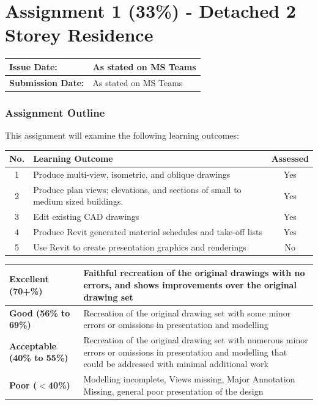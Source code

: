 
	
\part*{Assignment 1 (33\%) - Detached 2 Storey Residence}

\begin{tabularx}{\textwidth}{ |X|X| }
	\hline
	\textbf{Issue Date:} & As stated on MS Teams \\
	\hline 
	\textbf{Submission Date:}  & As stated on MS Teams \\
	\hline
\end{tabularx}


\section*{Assignment Outline}

This assignment will examine the following learning outcomes:\\

\begin{tabularx}{\textwidth}{ |c|X|c| }
	\hline
	\textbf{No.} & \textbf{Learning Outcome} & \textbf{Assessed} \\
	\hline 
	1  & Produce multi-view, isometric, and oblique drawings & Yes \\
	2  & Produce plan views; elevations, and sections of small to medium sized buildings. & Yes \\
	3  & Edit existing CAD drawings & Yes \\
	4  & Produce Revit generated material schedules and take-off lists & Yes \\
	5  & Use Revit to create presentation graphics and renderings & No \\
	\hline
\end{tabularx}


\vspace{1cm}

\begin{tabularx}{\textwidth}{ |l|X| }
	\hline 
	\textbf{Excellent (70+\%)} & Faithful recreation of the original drawings with no errors, and shows improvements over the original drawing set\\ 
	\hline
	\textbf{Good (56\% to 69\%)} & Recreation of the original drawing set with some minor errors or omissions in presentation and modelling \\
	\hline
	\textbf{Acceptable (40\% to 55\%)} & Recreation of the original drawing set with numerous minor errors or omissions in presentation and modelling that could be addressed with minimal additional work \\ 
	\hline
	\textbf{Poor ($<$40\%)} & Modelling incomplete, Views missing, Major Annotation Missing, general poor presentation of the design  \\
	\hline
\end{tabularx}

